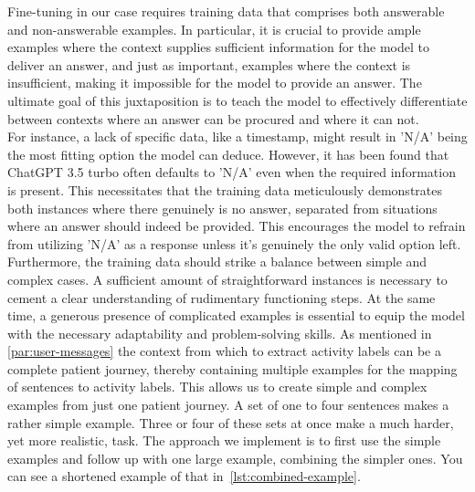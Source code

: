 Fine-tuning in our case requires training data that comprises both answerable and non-answerable examples. In particular, it is crucial to provide ample examples where the context supplies sufficient information for the model to deliver an answer, and just as important, examples where the context is insufficient, making it impossible for the model to provide an answer. The ultimate goal of this juxtaposition is to teach the model to effectively differentiate between contexts where an answer can be procured and where it can not.\\
For instance, a lack of specific data, like a timestamp, might result in 'N/A' being the most fitting option the model can deduce. However, it has been found that ChatGPT 3.5 turbo often defaults to 'N/A' even when the required information is present. This necessitates that the training data meticulously demonstrates both instances where there genuinely is no answer, separated from situations where an answer should indeed be provided. This encourages the model to refrain from utilizing 'N/A' as a response unless it’s genuinely the only valid option left.\\
Furthermore, the training data should strike a balance between simple and complex cases. A sufficient amount of straightforward instances is necessary to cement a clear understanding of rudimentary functioning steps. At the same time, a generous presence of complicated examples is essential to equip the model with the necessary adaptability and problem-solving skills. As mentioned in \ref{par:user-messages} the context from which to extract activity labels can be a complete patient journey, thereby containing multiple examples for the mapping of sentences to activity labels.  This allows us to create simple and complex examples from just one patient journey. A set of one to four sentences makes a rather simple example. Three or four of these sets at once make a much harder, yet more realistic, task. The approach we implement is to first use the simple examples and follow up with one large example, combining the simpler ones. You can see a shortened example of that in~\autoref{lst:combined-example}.
